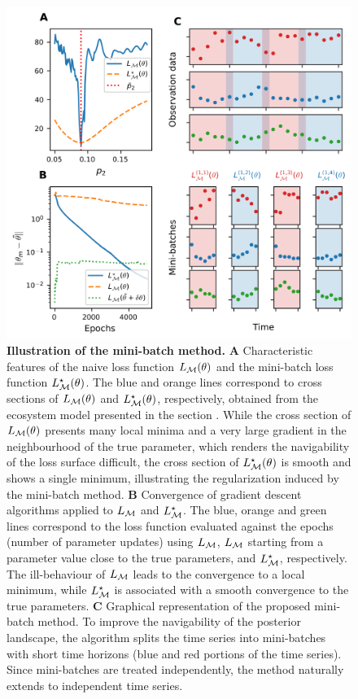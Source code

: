 \begin{figure}[h]
    \centering
    \includegraphics[]{figures/figure1.png}
    \caption{\textbf{Illustration of the mini-batch method.} 
    \textbf{A} Characteristic features of the naive loss function $L_{\mathcal{M}}(\theta)$ and the mini-batch loss function $L_{\mathcal{M}}^\star(\theta)$. The blue and orange lines correspond to cross sections of $L_{\mathcal{M}}(\theta)$ and $L_{\mathcal{M}}^\star(\theta)$, respectively, obtained from the ecosystem model presented in the section . While the cross section of $L_{\mathcal{M}}(\theta)$ presents many local minima and a very large gradient in the neighbourhood of the true parameter, which renders the navigability of the loss surface difficult, the cross section of $L_{\mathcal{M}}^\star(\theta)$ is smooth and shows a single minimum, illustrating the regularization induced by the mini-batch method. 
%
    \textbf{B} Convergence of gradient descent algorithms applied to $L_{\mathcal{M}}$ and $L_{\mathcal{M}}^\star$. The blue, orange and green lines correspond to the loss function evaluated against the epochs (number of parameter updates) using $L_{\mathcal{M}}$, $L_{\mathcal{M}}$ starting from a parameter value close to the true parameters, and $L_{\mathcal{M}}^\star$, respectively. The ill-behaviour of $L_{\mathcal{M}}$ leads to the convergence to a local minimum, while  $L_{\mathcal{M}}^\star$ is associated with a smooth convergence to the true parameters.
    \textbf{C} Graphical representation of the proposed mini-batch method. To improve the navigability of the posterior landscape, the algorithm splits the time series into mini-batches with short time horizons (blue and red portions of the time series). Since mini-batches are treated independently, the method naturally extends to independent time series.}
    \label{fig:training_on_mini-batches}
\end{figure}
\FloatBarrier

